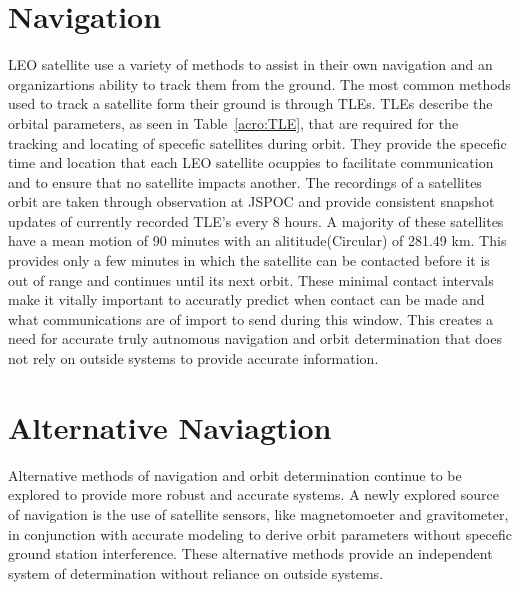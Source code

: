 \documentclass[conference]{IEEEtran}
\begin{document}
\section{Navigation}
\ac{LEO} satellite use a variety of methods to assist in their own navigation and an organizartions ability to track them from the ground. The most common methods used to track a satellite form their ground is through \ac{TLE}s. \ac{TLE}s describe the orbital parameters, as seen in Table~\ref{acro:TLE}, that are required for the tracking and locating of specefic satellites during orbit\cite{TwolineElementSets2012}. They provide the specefic time and location that each \ac{LEO} satellite ocuppies to facilitate communication and to ensure that no satellite impacts another. The recordings of a satellites orbit are taken through observation at \ac{JSPOC} and provide consistent snapshot updates of currently recorded TLE's every 8 hours\cite{TwolineElementSets2012}. 
A majority of these satellites have a mean motion of 90 minutes with an alititude(Circular) of 281.49 km\cite{spacetrack2026}. This provides only a few minutes in which the satellite can be contacted before it is out of range and continues until its next orbit. These minimal contact intervals make it vitally important to accuratly predict when contact can be made and what communications are of import to send during this window. This creates a need for accurate truly autnomous navigation and orbit determination that does not rely on outside systems to provide accurate information\cite{psiakiGroundTestsMagnetometerbased1993}.

\section{Alternative Naviagtion}
Alternative methods of navigation and orbit determination continue to be explored to provide more robust and accurate systems. A newly explored source of navigation is the use of satellite sensors, like magnetomoeter and gravitometer, in conjunction with accurate modeling to derive orbit parameters without specefic ground station interference\cite{finlayCHAOS7GeomagneticField2020,sunLowEarthOrbitDetermination2016, butcherKalmanFilteringObservability2017}. These alternative methods provide an independent system of determination without reliance on outside systems\cite{butcherKalmanFilteringObservability2017}.
\end{document}
